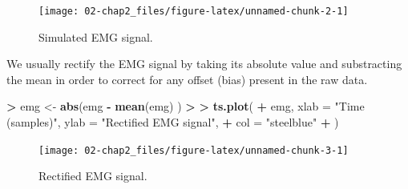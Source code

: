 \documentclass[12pt,]{book}
\newenvironment{Shaded}{\begin{snugshade}}{\end{snugshade}}
\newcommand{\KeywordTok}[1]{\textcolor[rgb]{0.13,0.29,0.53}{\textbf{#1}}}
\newcommand{\DataTypeTok}[1]{\textcolor[rgb]{0.13,0.29,0.53}{#1}}
\newcommand{\DecValTok}[1]{\textcolor[rgb]{0.00,0.00,0.81}{#1}}
\newcommand{\FloatTok}[1]{\textcolor[rgb]{0.00,0.00,0.81}{#1}}
\newcommand{\StringTok}[1]{\textcolor[rgb]{0.31,0.60,0.02}{#1}}
\newcommand{\OperatorTok}[1]{\textcolor[rgb]{0.81,0.36,0.00}{\textbf{#1}}}
\newcommand{\ErrorTok}[1]{\textcolor[rgb]{0.64,0.00,0.00}{\textbf{#1}}}
\newcommand{\NormalTok}[1]{#1}
\theoremstyle{definition}
\theoremstyle{definition}
\theoremstyle{definition}
\theoremstyle{remark}
\begin{document}
\begin{Shaded}
\end{Shaded}

\begin{figure}[H]

{\centering \texttt{[image: 02-chap2\_files/figure-latex/unnamed-chunk-2-1]} 

}

\caption{Simulated EMG signal.}\label{fig:unnamed-chunk-2}
\end{figure}

We usually rectify the EMG signal by taking its absolute value and
substracting the mean in order to correct for any offset (bias) present
in the raw data.

\begin{Shaded}
\begin{Highlighting}[]
\OperatorTok{>}\StringTok{ }\NormalTok{emg <-}\StringTok{ }\KeywordTok{abs}\NormalTok{(emg }\OperatorTok{-}\StringTok{ }\KeywordTok{mean}\NormalTok{(emg) )}
\OperatorTok{>}\StringTok{ }
\ErrorTok{>}\StringTok{ }\KeywordTok{ts.plot}\NormalTok{(}
\OperatorTok{+}\StringTok{   }\NormalTok{emg, }\DataTypeTok{xlab =} \StringTok{"Time (samples)"}\NormalTok{, }\DataTypeTok{ylab =} \StringTok{"Rectified EMG signal"}\NormalTok{,}
\OperatorTok{+}\StringTok{   }\DataTypeTok{col =} \StringTok{"steelblue"}
\OperatorTok{+}\StringTok{   }\NormalTok{)}
\end{Highlighting}
\end{Shaded}

\begin{figure}[H]

{\centering \texttt{[image: 02-chap2\_files/figure-latex/unnamed-chunk-3-1]} 

}

\caption{Rectified EMG signal.}\label{fig:unnamed-chunk-3}
\end{figure}
\end{document}
